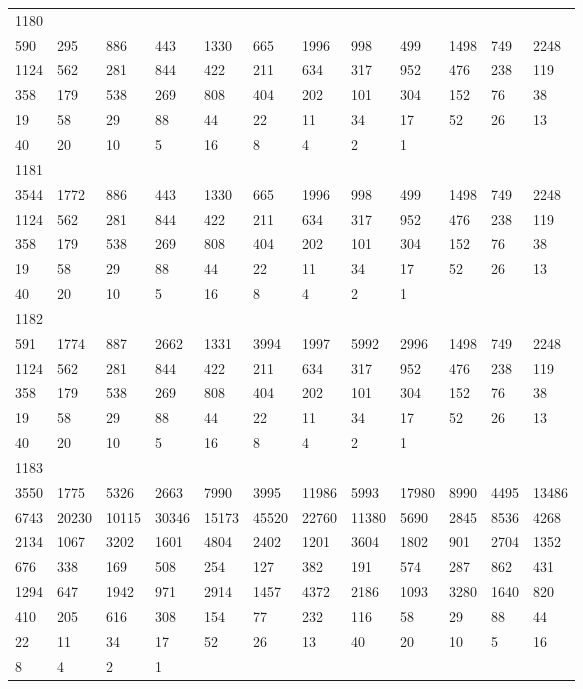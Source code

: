 \begin{longtable}{llllllllllll}
1180&&&&&&&&&&&\\
590& 295& 886& 443& 1330& 665& 1996& 998& 499& 1498& 749& 2248\\
1124& 562& 281& 844& 422& 211& 634& 317& 952& 476& 238& 119\\
358& 179& 538& 269& 808& 404& 202& 101& 304& 152& 76& 38\\
19& 58& 29& 88& 44& 22& 11& 34& 17& 52& 26& 13\\
40& 20& 10& 5& 16& 8& 4& 2& 1& \\

1181&&&&&&&&&&&\\
3544& 1772& 886& 443& 1330& 665& 1996& 998& 499& 1498& 749& 2248\\
1124& 562& 281& 844& 422& 211& 634& 317& 952& 476& 238& 119\\
358& 179& 538& 269& 808& 404& 202& 101& 304& 152& 76& 38\\
19& 58& 29& 88& 44& 22& 11& 34& 17& 52& 26& 13\\
40& 20& 10& 5& 16& 8& 4& 2& 1& \\

1182&&&&&&&&&&&\\
591& 1774& 887& 2662& 1331& 3994& 1997& 5992& 2996& 1498& 749& 2248\\
1124& 562& 281& 844& 422& 211& 634& 317& 952& 476& 238& 119\\
358& 179& 538& 269& 808& 404& 202& 101& 304& 152& 76& 38\\
19& 58& 29& 88& 44& 22& 11& 34& 17& 52& 26& 13\\
40& 20& 10& 5& 16& 8& 4& 2& 1& \\

1183&&&&&&&&&&&\\
3550& 1775& 5326& 2663& 7990& 3995& 11986& 5993& 17980& 8990& 4495& 13486\\
6743& 20230& 10115& 30346& 15173& 45520& 22760& 11380& 5690& 2845& 8536& 4268\\
2134& 1067& 3202& 1601& 4804& 2402& 1201& 3604& 1802& 901& 2704& 1352\\
676& 338& 169& 508& 254& 127& 382& 191& 574& 287& 862& 431\\
1294& 647& 1942& 971& 2914& 1457& 4372& 2186& 1093& 3280& 1640& 820\\
410& 205& 616& 308& 154& 77& 232& 116& 58& 29& 88& 44\\
22& 11& 34& 17& 52& 26& 13& 40& 20& 10& 5& 16\\
8& 4& 2& 1& \\


\end{longtable}
